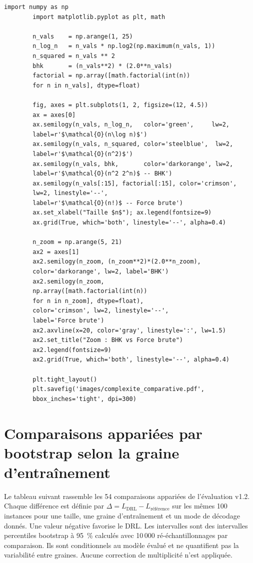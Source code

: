 \documentclass[12pt, a4paper, twoside, openright]{book}
\begin{document}
	\begin{lstlisting}[caption={Script de génération de la Figure~\ref{fig:complexite_comparative}.}, label={lst:figures}]
		import numpy as np
		import matplotlib.pyplot as plt, math
		
		n_vals    = np.arange(1, 25)
		n_log_n   = n_vals * np.log2(np.maximum(n_vals, 1))
		n_squared = n_vals ** 2
		bhk       = (n_vals**2) * (2.0**n_vals)
		factorial = np.array([math.factorial(int(n))
		for n in n_vals], dtype=float)
		
		fig, axes = plt.subplots(1, 2, figsize=(12, 4.5))
		ax = axes[0]
		ax.semilogy(n_vals, n_log_n,   color='green',     lw=2,
		label=r'$\mathcal{O}(n\log n)$')
		ax.semilogy(n_vals, n_squared, color='steelblue',  lw=2,
		label=r'$\mathcal{O}(n^2)$')
		ax.semilogy(n_vals, bhk,       color='darkorange', lw=2,
		label=r'$\mathcal{O}(n^2 2^n)$ -- BHK')
		ax.semilogy(n_vals[:15], factorial[:15], color='crimson',
		lw=2, linestyle='--',
		label=r'$\mathcal{O}(n!)$ -- Force brute')
		ax.set_xlabel("Taille $n$"); ax.legend(fontsize=9)
		ax.grid(True, which='both', linestyle='--', alpha=0.4)
		
		n_zoom = np.arange(5, 21)
		ax2 = axes[1]
		ax2.semilogy(n_zoom, (n_zoom**2)*(2.0**n_zoom),
		color='darkorange', lw=2, label='BHK')
		ax2.semilogy(n_zoom,
		np.array([math.factorial(int(n))
		for n in n_zoom], dtype=float),
		color='crimson', lw=2, linestyle='--',
		label='Force brute')
		ax2.axvline(x=20, color='gray', linestyle=':', lw=1.5)
		ax2.set_title("Zoom : BHK vs Force brute")
		ax2.legend(fontsize=9)
		ax2.grid(True, which='both', linestyle='--', alpha=0.4)
		
		plt.tight_layout()
		plt.savefig('images/complexite_comparative.pdf',
		bbox_inches='tight', dpi=300)
	\end{lstlisting}
	
	
	
	
	
	
	
\chapter{Comparaisons appariées par bootstrap selon la graine d'entraînement}
\label{app:multiseed-bootstrap}

Le tableau suivant rassemble les 54 comparaisons appariées de l'évaluation
v1.2. Chaque différence est définie par
$\Delta=L_{\mathrm{DRL}}-L_{\text{référence}}$ sur les mêmes 100 instances
pour une taille, une graine d'entraînement et un mode de décodage donnés.
Une valeur négative favorise le DRL. Les intervalles sont des intervalles
percentiles bootstrap à 95~\% calculés avec 10\,000 ré-échantillonnages par
comparaison. Ils sont conditionnels au modèle évalué et ne quantifient pas
la variabilité entre graines. Aucune correction de multiplicité n'est
appliquée.
\end{document}
